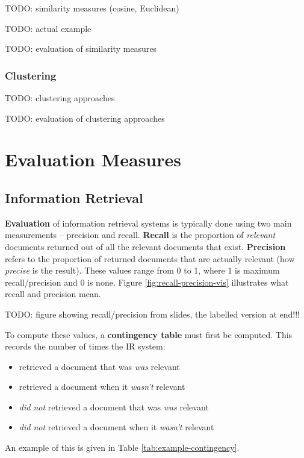 \documentclass{article}
\begin{document}
TODO: similarity measures (cosine, Euclidean)

TODO: actual example

TODO: evaluation of similarity measures

\subsubsection{Clustering}

TODO: clustering approaches

TODO: evaluation of clustering approaches

\section{Evaluation Measures}

\subsection{Information Retrieval}
\label{sec:ir-evaluation}

\textbf{Evaluation} of information retrieval systems is typically done using two main measurements -- precision and recall. \textbf{Recall} is the proportion of \textit{relevant} documents returned out of all the relevant documents that exist. \textbf{Precision} refers to the proportion of returned documents that are actually relevant (how \textit{precise} is the result). These values range from 0 to 1, where 1 is maximum recall/precision and 0 is none. Figure \ref{fig:recall-precision-vis} illustrates what recall and precision mean.

TODO: figure showing recall/precision from slides, the labelled version at end!!!

To compute these values, a \textbf{contingency table} must first be computed. This records the number of times the IR system:
\begin{itemize}
	\item retrieved a document that was \textit{was} relevant
	\item retrieved a document when it \textit{wasn't} relevant
	\item \textit{did not} retrieved a document that was \textit{was} relevant
	\item \textit{did not} retrieved a document when it \textit{wasn't} relevant
\end{itemize}
An example of this is given in Table \ref{tab:example-contingency}.
\end{document}
